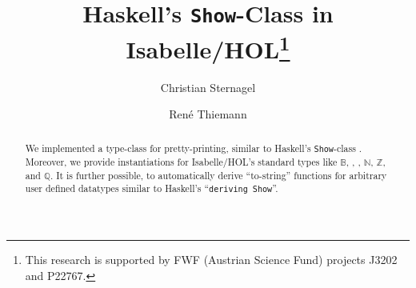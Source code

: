 \documentclass[11pt,a4paper]{article}
\newcommand\nats{\mathbb{N}}
\newcommand\bools{\mathbb{B}}
\newcommand\ints{\mathbb{Z}}
\newcommand\rats{\mathbb{Q}}
\newcommand\Show{\texttt{Show}}
\begin{document}
\title{Haskell's \Show-Class in Isabelle/HOL\thanks{This research is supported by FWF (Austrian Science Fund) projects J3202 and P22767.}}
\author{Christian Sternagel \and Ren\'e Thiemann}
\maketitle

\begin{abstract}
  We implemented a type-class for pretty-printing, similar to Haskell's
  \Show-class \cite{HaskellTutorial}. Moreover, we provide instantiations for Isabelle/HOL's 
  standard types like $\bools$, , , $\nats$, $\ints$, and $\rats$.
  It is further possible, to automatically derive ``to-string'' functions for
  arbitrary user defined datatypes similar to Haskell's ``\texttt{deriving Show}''.
\end{abstract}



\tableofcontents





\end{document}
